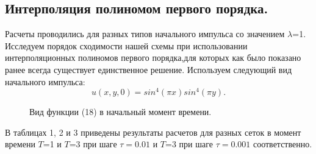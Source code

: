 \documentclass[14pt]{article}
\begin{document}
\subsection{Интерполяция полиномом первого порядка.}
Расчеты проводились для разных типов начального импульса со значением $\lambda$=1. Исследуем порядок сходимости нашей схемы при использовании интерполяционных полиномов первого порядка,для которых как было показано ранее всегда существует единственное решение. Используем следующий вид начального импульса:
\begin{equation}
u(x,y,0) = sin^4(\pi x)sin^4(\pi y).
\end{equation}
\begin{figure}[h!]
\caption{Вид функции (18) в начальный момент времени.}
\end{figure}
В таблицах 1, 2 и 3 приведены результаты расчетов для разных сеток в момент времени $T$=1 и $T$=3 при шаге $\tau=0.01$ и $T$=3 при шаге $\tau=0.001$ соответственно.
\end{document}

